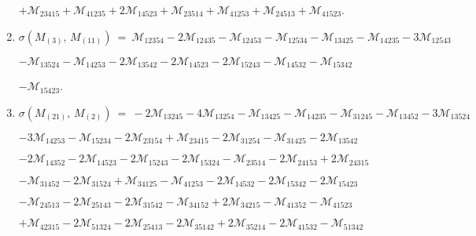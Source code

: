 \documentclass[12pt]{article}
\newcommand{\M}{\mathcal{M}}
\begin{document}
\begin{enumerate}
      \hspace{10pt}
      $+\M_{23415} 
       +\M_{41235} +2\M_{14523} 
       +\M_{23514} +\M_{41253} 
       +\M_{24513} +\M_{41523} $.\vspace{-8pt}
\item[]\hspace{-50pt}$\sigma(M_{(3)},\,M_{(11)})\ =\ 
        \M_{12354} -2\M_{12435} 
       -\M_{12453} -\M_{12534} 
       -\M_{13425} -\M_{14235} 
       -3\M_{12543} $\vspace{-6pt}

      \hspace{10pt}
      $-\M_{13524} 
       -\M_{14253} -2\M_{13542} 
       -2\M_{14523} -2\M_{15243} 
       -\M_{14532} -\M_{15342} $\vspace{-6pt}

      \hspace{10pt}
      $-\M_{15423} $.\vspace{-8pt}
\item[]\hspace{-50pt}$\sigma(M_{(21)},\,M_{(2)})\ =\ 
        -2\M_{13245} -4\M_{13254} 
       -\M_{13425} -\M_{14235} 
       -\M_{31245} -\M_{13452} 
       -3\M_{13524} $\vspace{-6pt}

      \hspace{10pt}
      $-3\M_{14253} 
       -\M_{15234} -2\M_{23154} 
       +\M_{23415} -2\M_{31254} 
       -\M_{31425} -2\M_{13542} $\vspace{-6pt}

      \hspace{10pt}
      $-2\M_{14352} -2\M_{14523} 
       -2\M_{15243} -2\M_{15324} 
       -\M_{23514} -2\M_{24153} 
       +2\M_{24315} $\vspace{-6pt}

      \hspace{10pt}
      $-\M_{31452} 
       -2\M_{31524} +\M_{34125} 
       -\M_{41253} -2\M_{14532} 
       -2\M_{15342} -2\M_{15423} $\vspace{-6pt}

      \hspace{10pt}
      $-\M_{24513} -2\M_{25143} 
       -2\M_{31542} -\M_{34152} 
       +2\M_{34215} -\M_{41352} 
       -\M_{41523} $\vspace{-6pt}

      \hspace{10pt}
      $+\M_{42315} 
       -2\M_{51324} -2\M_{25413} 
       -2\M_{35142} +2\M_{35214} 
       -2\M_{41532} -\M_{51342} $\vspace{-6pt}


\end{enumerate}
\end{document}
